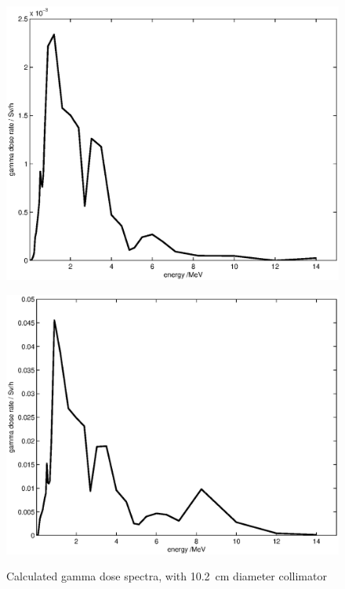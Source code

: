 \documentclass[11pt,a4paper]{IEEEtran}
\let\MYoriglatexcaption\caption
\renewcommand{\caption}[2][\relax]{\MYoriglatexcaption[#2]{#2}}
\begin{document}
\begin{figure}[t]
    \begin{minipage}{\columnwidth}
        \centering
        \includegraphics[width=0.9\columnwidth]{DoseVSenergySUP.eps}
        \label{fig:GammaDoseEnergySUP}
    \end{minipage}
    \begin{minipage}{\columnwidth}
        \centering
        \includegraphics[width=0.9\columnwidth]{DoseVSenergyCUP.eps}
        \label{fig:GammaDoseEnergyCUP}
    \end{minipage}
    \caption{
        Calculated gamma dose spectra, with
        \SI{10.2}{\cm} diameter collimator
    }
    \label{fig:GammaDoseEnergy}
\end{figure}
\end{document}

